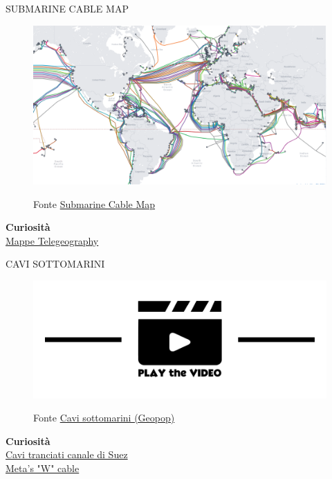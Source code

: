 \documentclass[aspectratio=1610]{beamer}
\begin{document}
\begin{frame}{SUBMARINE CABLE MAP}
    \begin{figure}
        \href{https://www.submarinecablemap.com/}{\includegraphics[width=.8\linewidth]{img/SubmarineCableMap.png}}
        \caption{{Fonte \href{https://www.submarinecablemap.com/}{Submarine Cable Map}}}
    \end{figure}       
    \bigskip
    \tiny{\textbf{Curiosità}}\\
    \tiny{\href{https://blog.telegeography.com/topic/maps}{Mappe Telegeography}} 
\end{frame}

\begin{frame}{CAVI SOTTOMARINI}
    \begin{figure}
        \href{https://www.geopop.it/serie/cavi-sottomarini/}{\includegraphics[width=\linewidth]{img/play.png}}
        \caption{{Fonte \href{https://www.geopop.it/serie/cavi-sottomarini/}{Cavi sottomarini (Geopop)}}}
    \end{figure}   
    \bigskip
    \tiny{\textbf{Curiosità}}\\
    \tiny{
        \href{https://www.agendadigitale.eu/infrastrutture/cavi-tranciati-a-suez-goretti-namex-ecco-come-ridurre-il-rischio/}{Cavi tranciati canale di Suez}\\
        \href{https://techcrunch.com/2024/11/29/meta-plans-to-build-a-10b-subsea-cable-spanning-the-world-sources-say/}{Meta's "W" cable}
    }     
\end{frame}
\end{document}
